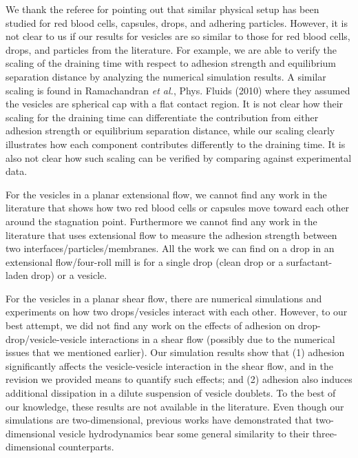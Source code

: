 \documentclass[11pt]{article}
\begin{document}
\begin{enumerate}
\begin{itemize}
 We thank the referee for pointing out that similar physical setup has
    been studied for red blood cells, capsules, drops, and adhering
    particles. However, it is not clear to us if our results for
    vesicles are so similar to those for red blood cells, drops, and
    particles from the literature. For example, we are able to verify
    the scaling of the draining time with respect to adhesion strength
    and equilibrium separation distance by analyzing the numerical
    simulation results.  A similar scaling is found in Ramachandran {\em
    et al.}, Phys. Fluids (2010) where they assumed the vesicles are
    spherical cap with a flat contact region.  It is not clear how their
    scaling for the draining time can differentiate the contribution
    from either adhesion strength or equilibrium separation distance,
    while our scaling clearly illustrates how each component contributes
    differently to the draining time. It is also not clear how such
    scaling can be verified by comparing against experimental data.

For the vesicles in a planar extensional flow, we cannot find any work
    in the literature that shows how two red blood cells or capsules move
    toward each other around the stagnation point. Furthermore we cannot
    find any work in the literature that uses extensional flow to
    measure the adhesion strength between two
    interfaces/particles/membranes. All the work we can find on a drop
    in an extensional flow/four-roll mill is for a single drop (clean
    drop or a surfactant-laden drop) or a vesicle.

For the vesicles in a planar shear flow, there are numerical simulations
    and experiments on how two drops/vesicles interact with each other.
    However, to our best attempt, we did not find any work on the
    effects of adhesion on drop-drop/vesicle-vesicle interactions in a
    shear flow (possibly due to the numerical issues that we mentioned
    earlier). Our simulation results show that (1) adhesion
    significantly affects the vesicle-vesicle interaction in the shear
    flow, and in the revision we provided means to quantify such
    effects; and (2) adhesion also induces additional dissipation in a
    dilute suspension of vesicle doublets. To the best of our knowledge,
    these results are not available in the literature. Even though our
    simulations are two-dimensional, previous works have demonstrated
    that two-dimensional vesicle hydrodynamics bear some general
    similarity to their three-dimensional counterparts. 


\end{itemize}
\end{enumerate}
\end{document}
